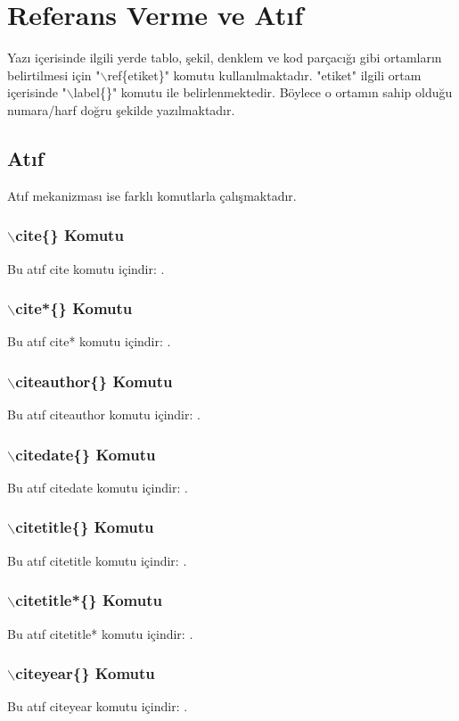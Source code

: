 \chapter{Referans Verme ve Atıf}
\label{ch:ref}
Yazı içerisinde ilgili yerde tablo, şekil, denklem ve kod parçacığı gibi ortamların belirtilmesi için "$\backslash$ref\{etiket\}" komutu kullanılmaktadır. "etiket" ilgili ortam içerisinde "$\backslash$label\{\}" komutu ile belirlenmektedir. Böylece o ortamın sahip olduğu numara/harf doğru şekilde yazılmaktadır. 

\section{Atıf}
Atıf mekanizması ise farklı komutlarla çalışmaktadır.

\subsection{$\backslash$cite\{\} Komutu}
Bu atıf cite komutu içindir: \cite{tekyazarArticle}.
\subsection{$\backslash$cite*\{\} Komutu}
Bu atıf cite* komutu içindir: \cite*{tekyazarArticle2}.
\subsection{$\backslash$citeauthor\{\} Komutu}
Bu atıf citeauthor komutu içindir: \citeauthor{tekyazarArticle}.
\subsection{$\backslash$citedate\{\} Komutu}
Bu atıf citedate komutu içindir: .
\subsection{$\backslash$citetitle\{\} Komutu}
Bu atıf citetitle komutu içindir: .
\subsection{$\backslash$citetitle*\{\} Komutu}
Bu atıf citetitle* komutu içindir: .
\subsection{$\backslash$citeyear\{\} Komutu}
Bu atıf citeyear komutu içindir: \citeyear{tekyazarArticle}.
